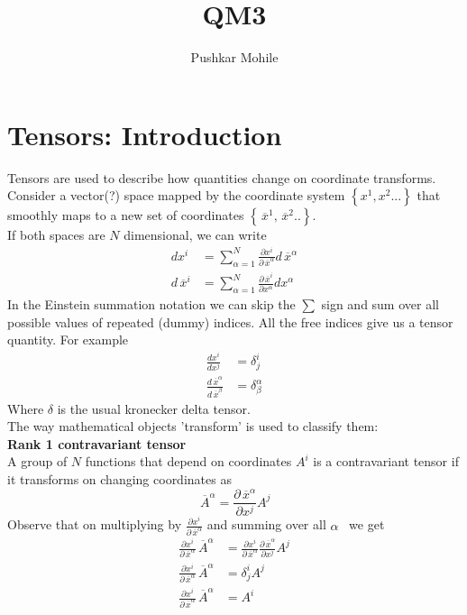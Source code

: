 \documentclass{article}
\title{QM3 }
\author{Pushkar Mohile}
\newcommand{\set}[1]{ \left\{ #1 \right\} }
\newcommand{\olsi}[1]{\,\overline{\!{#1}}} %
\newcommand{\bx}{\olsi{x}}
\begin{document}
\maketitle

\section{Tensors: Introduction}
Tensors are used to describe how quantities change on coordinate transforms. 
%
Consider a vector(?) space mapped by the coordinate system \( \set{x^1,x^2...}\) that smoothly maps 
to a new set of coordinates  \(\set{\bx^1, \bx^2..}\). 
\\
If both spaces are \(N\) dimensional, we can write 
\begin{align*}
    dx^i &= \sum_{\alpha = 1}^N\frac{\partial x^i}{\partial \bx^\alpha} d\bx^\alpha \\
    d\bx^i &= \sum_{\alpha = 1}^N\frac{\partial \bx^i}{\partial x^\alpha} dx^\alpha
\end{align*}
In the Einstein summation notation we can skip the \(\sum\) sign and sum over all possible values of
 repeated (dummy) indices. All the free indices give us a tensor quantity. For example
\begin{align*}
    \frac{dx^i}{dx^j} &= \delta_j^i \\
    \frac{d\bx^\alpha}{d\bx^\beta} &= \delta_\beta^\alpha
\end{align*}
Where \(\delta \) is the usual kronecker delta tensor. \\
The way mathematical objects 'transform' is used to classify them: \\
\textbf{Rank 1 contravariant tensor} \\
A group of \(N\) functions that depend on coordinates \(A^{i}\) is a contravariant tensor if it transforms on changing coordinates as
\begin{equation*}
    \olsi{A}^\alpha = \frac{\partial \bx^\alpha }{\partial x^j}A^j
\end{equation*} 
Observe that on multiplying by \(\frac{\partial x^i}{\partial\bx^\alpha} \) and summing over all \(\alpha\) \
we get 
\begin{align*}
    \frac{\partial x^i}{\partial \bx^\alpha} \olsi{A}^\alpha &=  \frac{\partial x^i}{\partial \bx^\alpha} \frac{\partial \bx^\alpha }{\partial x^j}A^j \\
    \frac{\partial x^i}{\partial \bx^\alpha} \olsi{A}^\alpha &= \delta_j^i A^j \\
    \frac{\partial x^i}{\partial \bx^\alpha} \olsi{A}^\alpha &= A^i
\end{align*}
\end{document}

